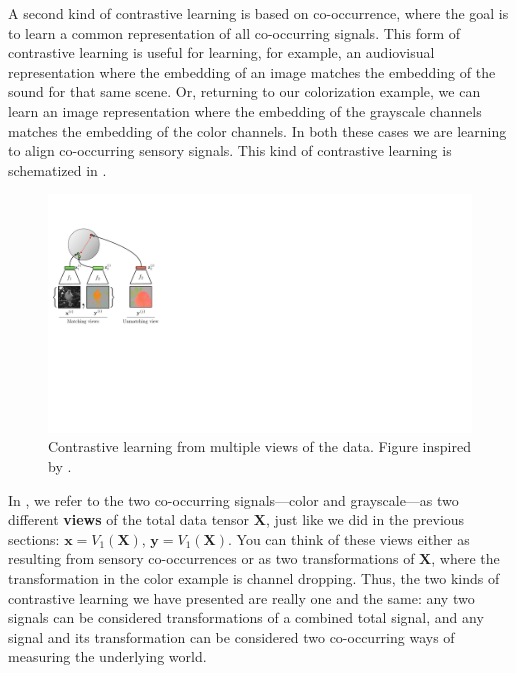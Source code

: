 A second kind of contrastive learning is based on co-occurrence, where the goal is to learn a common representation of all co-occurring signals. This form of contrastive learning is useful for learning, for example, an audiovisual representation where the embedding of an image matches the embedding of the sound for that same scene. Or, returning to our colorization example, we can learn an image representation where the embedding of the grayscale channels matches the embedding of the color channels. In both these cases we are learning to align co-occurring sensory signals. This kind of contrastive learning is schematized in \fig{\ref{fig:representation_learning:contrastive_learning_colorization}}.
\begin{figure}[h!]
    \centerline{
        \includegraphics[width=0.53\linewidth]{figures/representation_learning/contrastive_learning_colorization.pdf}
    }
    \caption{Contrastive learning from multiple views of the data. Figure inspired by \cite{tian2020contrastive}.}
    \label{fig:representation_learning:contrastive_learning_colorization}
\end{figure}

In \fig{\ref{fig:representation_learning:contrastive_learning_colorization}}, we refer to the two co-occurring signals—color and grayscale—as two different \textbf{views} of the total data tensor $\mathbf{X}$, just like we did in the previous sections: $\mathbf{x} = V_1(\mathbf{X})$, $\mathbf{y} = V_1(\mathbf{X})$. You can think of these views either as resulting from sensory co-occurrences or as two transformations of $\mathbf{X}$, where the transformation in the color example is channel dropping. Thus, the two kinds of contrastive learning we have presented are really one and the same: any two signals can be considered transformations of a combined total signal, and any signal and its transformation can be considered two co-occurring ways of measuring the underlying world.

